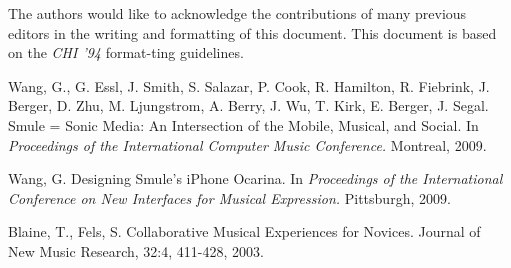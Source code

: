 \documentclass{article}
\begin{document}
The authors would like to acknowledge the contributions of many previous
editors in the writing and formatting of this document.  This document is based on
the {\em CHI '94} format-ting guidelines.

\begin{thebibliography}{9}

 Wang, G., G. Essl, J. Smith, S. Salazar, P. Cook, R. Hamilton, R. Fiebrink, J. Berger, D. Zhu, M. Ljungstrom, A. Berry, J. Wu, T. Kirk, E. Berger, J. Segal. Smule = Sonic Media: An Intersection of the Mobile, Musical, and Social.
In {\em Proceedings of the International Computer Music Conference.}
Montreal, 2009.

 Wang, G. Designing Smule’s iPhone Ocarina.
In {\em Proceedings of the International Conference on New Interfaces for Musical Expression.}
Pittsburgh, 2009.

 Blaine, T., Fels, S. Collaborative Musical Experiences for Novices.
Journal of New Music Research, 32:4, 411-428, 2003.
\end{thebibliography}
\end{document}
